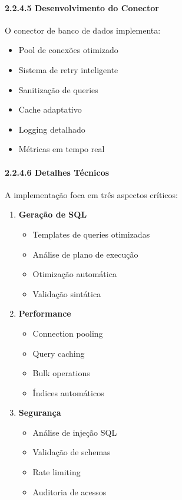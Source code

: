\documentclass[
]{article}
\providecommand{\tightlist}{%
  \setlength{\itemsep}{0pt}\setlength{\parskip}{0pt}}
\begin{document}
\paragraph{2.2.4.5 Desenvolvimento do
Conector}\label{desenvolvimento-do-conector}

O conector de banco de dados implementa:

\begin{itemize}
\tightlist
\item
  Pool de conexões otimizado
\item
  Sistema de retry inteligente
\item
  Sanitização de queries
\item
  Cache adaptativo
\item
  Logging detalhado
\item
  Métricas em tempo real
\end{itemize}

\paragraph{2.2.4.6 Detalhes Técnicos}\label{detalhes-tuxe9cnicos-2}

A implementação foca em três aspectos críticos:

\begin{enumerate}
\def\labelenumi{\arabic{enumi}.}
\tightlist
\item
  \textbf{Geração de SQL}

  \begin{itemize}
  \tightlist
  \item
    Templates de queries otimizadas
  \item
    Análise de plano de execução
  \item
    Otimização automática
  \item
    Validação sintática
  \end{itemize}
\item
  \textbf{Performance}

  \begin{itemize}
  \tightlist
  \item
    Connection pooling
  \item
    Query caching
  \item
    Bulk operations
  \item
    Índices automáticos
  \end{itemize}
\item
  \textbf{Segurança}

  \begin{itemize}
  \tightlist
  \item
    Análise de injeção SQL
  \item
    Validação de schemas
  \item
    Rate limiting
  \item
    Auditoria de acessos
  \end{itemize}
\end{enumerate}
\end{document}
